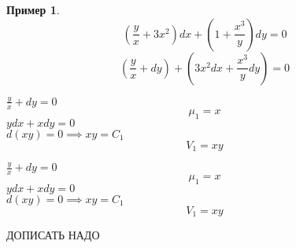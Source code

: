 \documentclass{report}
\theoremstyle{definition}
\newtheorem{example}{Пример}
\begin{document}
\begin{example}
    \begin{equation*}
        (\frac{y}{x} + 3x^2)dx + (1 + \frac{x^3}{y})dy = 0
    \end{equation*}
    \begin{equation*}
        (\frac{y}{x} + dy) + (3x^2 dx + \frac{x^3}{y}dy) = 0
    \end{equation*}
    \begin{minipage}{0.4\textwidth}
        $\frac{y}{x} + dy = 0$ \\
        \begin{equation*}
            \mu_1 = x
        \end{equation*}
        $ydx + xdy = 0$ \\
        $d(xy) = 0 \implies xy = C_1$ \\
        \begin{equation*}
            V_1 = xy
        \end{equation*}
    \end{minipage}
    \hfill
    \begin{minipage}{0.4\textwidth}
        $\frac{y}{x} + dy = 0$ \\
        \begin{equation*}
            \mu_1 = x
        \end{equation*}
        $ydx + xdy = 0$ \\
        $d(xy) = 0 \implies xy = C_1$ \\
        \begin{equation*}
            V_1 = xy
        \end{equation*}
    \end{minipage}
\end{example}

\begin{center}
    {\Large ДОПИСАТЬ НАДО}
\end{center}
\end{document}
